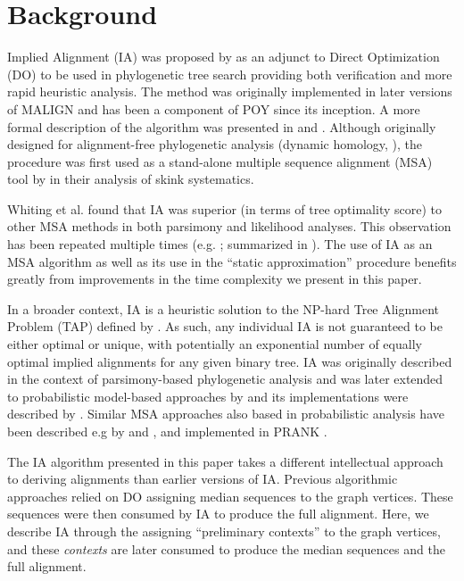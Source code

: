 \documentclass{bmcart}
\begin{document}
\section*{Background}

Implied Alignment (IA) was proposed by \cite{Wheeler2003} as an adjunct to Direct Optimization (DO) \citep{Wheeler1996,VaronandWheeler2012} to be used in phylogenetic tree search providing both verification and more rapid heuristic analysis.
The method was originally implemented in later versions of MALIGN \citep{Wheeler1991-1998} and has been a component of POY \citep{Wheeleretal2015, POY2, POY3, POY5, Wheeleretal2006} since its inception.
A more formal description of the algorithm was presented in \cite{Wheeleretal2006} and \cite{VaronandWheeler2012}.
Although originally designed for alignment-free phylogenetic analysis (dynamic homology, \citealp{Wheeler2001}), the procedure was first used as a stand-alone multiple sequence alignment (MSA) tool by \cite{WhitingAetal2006} in their analysis of skink systematics.

Whiting et al. found that IA was superior (in terms of tree optimality score) to other MSA methods in both parsimony and likelihood analyses.
This observation has been repeated multiple times (e.g. \citealp{LindgrenandDaly2007, Lehtonen2008, WheelerandGiribet2009, FordandWheeler2015}; summarized in \citealp{Wheeler2012}).
The use of IA as an MSA algorithm as well as its use in the ``static approximation'' procedure \citep{Wheeler2003b} benefits greatly from improvements in the time complexity we present in this paper.

In a broader context, IA is a heuristic solution to the NP-hard Tree Alignment Problem (TAP) defined by \cite{sankoff1975}.
As such, any individual IA is not guaranteed to be either optimal or unique, with potentially an exponential number of equally optimal implied alignments for any given binary tree.
IA was originally described in the context of parsimony-based phylogenetic analysis and was later extended to probabilistic model-based approaches by \cite{Wheeler2006} and its implementations were described by \citep{Varonetal2010,Wheeleretal2015}.
Similar MSA approaches also based in probabilistic analysis have been described e.g by \cite{Loytynoja2005} and \cite{Paten2008}, and implemented in PRANK \citep{PRANK}.

The IA algorithm presented in this paper takes a different intellectual approach to deriving alignments than earlier versions of IA.
Previous algorithmic approaches relied on DO assigning median sequences to the graph vertices. These sequences were then consumed by IA to produce the full alignment.
Here, we describe IA through the assigning ``preliminary contexts'' to the graph vertices, and these \textit{contexts} are later consumed to produce the median sequences and the full alignment.
\end{document}
